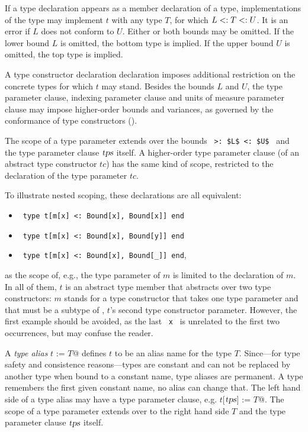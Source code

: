 If a type declaration appears as a member declaration of a type, implementations of the type may implement $t$ with any type $T$, for which $L <: T <: U$. It is an error if $L$ does not conform to $U$. Either or both bounds may be omitted. If the lower bound $L$ is omitted, the bottom type  is implied. If the upper bound $U$ is omitted, the top type  is implied. 

A type constructor declaration declaration imposes additional restriction on the concrete types for which $t$ may stand. Besides the bounds $L$ and $U$, the type parameter clause, indexing parameter clause and units of measure parameter clause may impose higher-order bounds and variances, as governed by the conformance of type constructors ().

The scope of a type parameter extends over the bounds ~\lstinline!>: $L$ <: $U$!~ and the type parameter clause $\mbox{\sl tps}$ itself. A higher-order type parameter clause (of an abstract type constructor $tc$) has the same kind of scope, restricted to the declaration of the type parameter $tc$. 

To illustrate nested scoping, these declarations are all equivalent: 
\begin{itemize}
\item[]
~\lstinline!type t[m[x] <: Bound[x], Bound[x]] end! 

\item[]
~\lstinline!type t[m[x] <: Bound[x], Bound[y]] end!

\item[]
~\lstinline!type t[m[x] <: Bound[x], Bound[_]] end!,
\end{itemize} 
as the scope of, e.g., the type parameter of $m$ is limited to the declaration of $m$. In all of them, $t$ is an abstract type member that abstracts over two type constructors: $m$ stands for a type constructor that takes one type parameter and that must be a subtype of , $t$'s second type constructor parameter. However, the first example should be avoided, as the last ~\lstinline!x!~ is unrelated to the first two occurrences, but may confuse the reader. 

A {\em type alias} \lstinline@type $t$ := $T$@ defines $t$ to be an alias name for the type $T$. Since---for type safety and consistence reasons---types are constant and can not be replaced by another type when bound to a constant name, type aliases are permanent. A type remembers the first given constant name, no alias can change that. The left hand side of a type alias may have a type parameter clause, e.g. \lstinline@type $t$[$\mbox{\sl tps}$] := $T$@. The scope of a type parameter extends over to the right hand side $T$ and the type parameter clause $\mbox{\sl tps}$ itself. 

